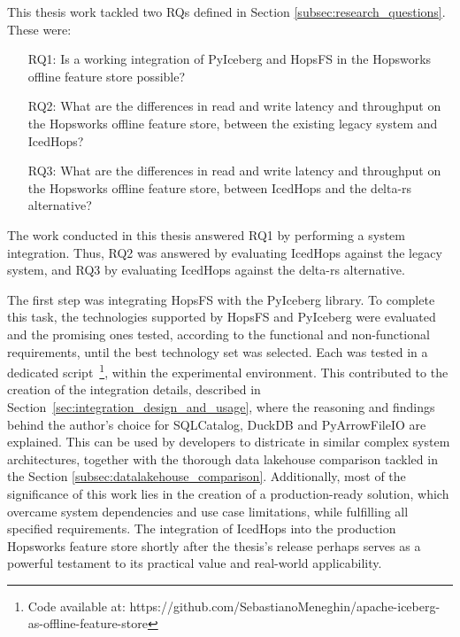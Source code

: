 This thesis work tackled two \glspl{RQ} defined in Section \ref{subsec:research_questions}. These were: 
\begin{enumerate}
    \item[RQ1:] Is a working integration of PyIceberg and HopsFS in the Hopsworks offline feature store possible?
    \item[RQ2:] What are the differences in read and write latency and throughput on the Hopsworks offline feature store, between the existing legacy system and IcedHops?
    \item[RQ3:] What are the differences in read and write latency and throughput on the Hopsworks offline feature store, between IcedHops and the delta-rs alternative?
\end{enumerate}
The work conducted in this thesis answered \gls{RQ}1 by performing a system integration. Thus, \gls{RQ}2 was answered by evaluating IcedHops against the legacy system, and \gls{RQ}3 by evaluating IcedHops against the delta-rs alternative.

The first step was integrating \gls{HopsFS} with the PyIceberg library. To complete this task, the technologies supported by \gls{HopsFS} and PyIceberg were evaluated and the promising ones tested, according to the functional and non-functional requirements, until the best technology set was selected. Each was tested in a dedicated script~\footnote{Code available at: https://github.com/SebastianoMeneghin/apache-iceberg-as-offline-feature-store}, within the experimental environment. This contributed to the creation of the integration details, described in Section~\ref{sec:integration_design_and_usage}, where the reasoning and findings behind the author's choice for SQLCatalog, DuckDB and PyArrowFileIO are explained. This can be used by developers to districate in similar complex system architectures, together with the thorough data lakehouse comparison tackled in the Section \ref{subsec:datalakehouse_comparison}. Additionally, most of the significance of this work lies in the creation of a production-ready solution, which overcame system dependencies and use case limitations, while fulfilling all specified requirements. The integration of IcedHops into the production Hopsworks feature store shortly after the thesis's release perhaps serves as a powerful testament to its practical value and real-world applicability.

